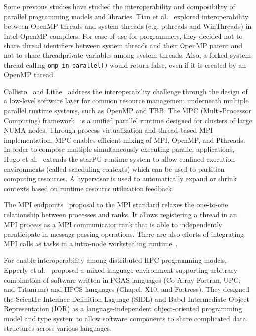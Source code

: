 Some previous studies have studied the interoperability and composibility of parallel programming models and libraries. 
Tian et al.~\cite{tian2003compiler} explored interoperability between OpenMP threads and system threads (e.g. pthreads and WinThreads) in Intel OpenMP compilers.
For ease of use for programmers, they decided not to share thread identifiers between system threads and their OpenMP parent
and not to share threadprivate variables among system threads.
Also, a forked system thread calling \lstinline{omp_in_parallel()} would return false, even if it is created by an OpenMP thread. 

Callisto~\cite{Callisto:Harris:2014:CCP:2592798.2592807} and
Lithe~\cite{Lithe:Pan:2009:LEE:1855591.1855602} 
address the interoperability challenge 
through the design of a low-level software layer for common 
resource management underneath multiple parallel runtime systems, such as OpenMP and TBB. %
The MPC (Multi-Processor Computing) framework~\cite{perache2008mpc} is a unified parallel runtime designed for clusters of large NUMA nodes. 
Through process virtualization and thread-based MPI implementation, MPC enables efficient mixing of MPI, OpenMP, and Pthreads. 
In order to compose multiple simultaneously executing parallel applications, Hugo et al.~\cite{hugo2014composing} extends the starPU runtime system to allow confined execution environments (called scheduling contexts) which can be used to partition computing resources. 
A hypervisor is used to automatically expand or shrink contexts based on runtime resource utilization feedback. 

The MPI endpoints~\cite{Dinan:mpiendpoint_eurompi13}
proposal to the MPI standard relaxes the one-to-one relationship between processes and ranks.
It allows registering a thread in an MPI
process as a MPI communicator rank that is able to independently paraticipate
in message passing operations. There are also efforts of integrating MPI calls as
tasks in a intra-node workstealing runtime~\cite{hcmpi:ipdps13}.

For enable interoperability among distributed HPC programming models, Epperly et al.~\cite{epperly2011composite} proposed a mixed-language environment supporting arbitrary combination of software written in PGAS languages (Co-Array Fortran, UPC, and Titanium) and HPCS languages (Chapel, X10, and Fortress). 
They designed the Scientfic Interface Definition Laguage (SIDL) and Babel Intermediate Object Representation (IOR) as a language-independent object-oriented programming model and type system
to allow software components to share complicated data structures across various languages. 

